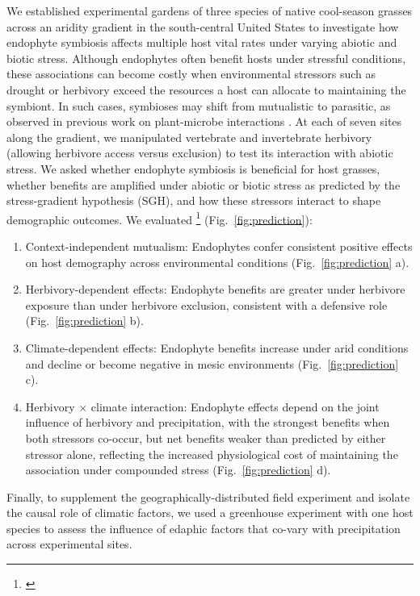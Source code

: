 \documentclass[12pt]{article}\usepackage[]{graphicx}\usepackage[dvipsnames]{xcolor}
\newcommand{\jacob}[2]{{\color{blue}{#1}}\footnote{\textit{\color{blue}{#2}}}}
\begin{document}
We established experimental gardens of three species of native cool-season grasses across an aridity gradient in the south-central United States to investigate how endophyte symbiosis affects multiple host vital rates under varying abiotic and biotic stress. 
Although endophytes often benefit hosts under stressful conditions, these associations can become costly when environmental stressors such as drought or herbivory exceed the resources a host can allocate to maintaining the symbiont. 
In such cases, symbioses may shift from mutualistic to parasitic, as observed in previous work on plant-microbe interactions \citep{johnson1997functioning}.
At each of seven sites along the gradient, we manipulated vertebrate and invertebrate herbivory (allowing herbivore access versus exclusion) to test its interaction with abiotic stress.
We asked whether endophyte symbiosis is beneficial for host grasses, whether benefits are amplified under abiotic or biotic stress as predicted by the stress-gradient hypothesis (SGH), and how these stressors interact to shape demographic outcomes. 
We evaluated \jacob{four alternative hypotheses}{I have updated this with your shematic} (Fig.~\ref{fig:prediction}):
\begin{enumerate}
\item Context-independent mutualism: Endophytes confer consistent positive effects on host demography across environmental conditions (Fig.~\ref{fig:prediction} a).
\item Herbivory-dependent effects: Endophyte benefits are greater under herbivore exposure than under herbivore exclusion, consistent with a defensive role (Fig.~\ref{fig:prediction} b).
\item Climate-dependent effects: Endophyte benefits increase under arid conditions and decline or become negative in mesic environments (Fig.~\ref{fig:prediction} c).
\item Herbivory × climate interaction: Endophyte effects depend on the joint influence of herbivory and precipitation, with the strongest benefits when both stressors co-occur, but net benefits weaker than predicted by either stressor alone, reflecting the increased physiological cost of maintaining the association under compounded stress (Fig.~\ref{fig:prediction} d).
\end{enumerate}
Finally, to supplement the geographically-distributed field experiment and isolate the causal role of climatic factors, we used a greenhouse experiment with one host species to assess the influence of edaphic factors that co-vary with precipitation across experimental sites. 
\end{document}
